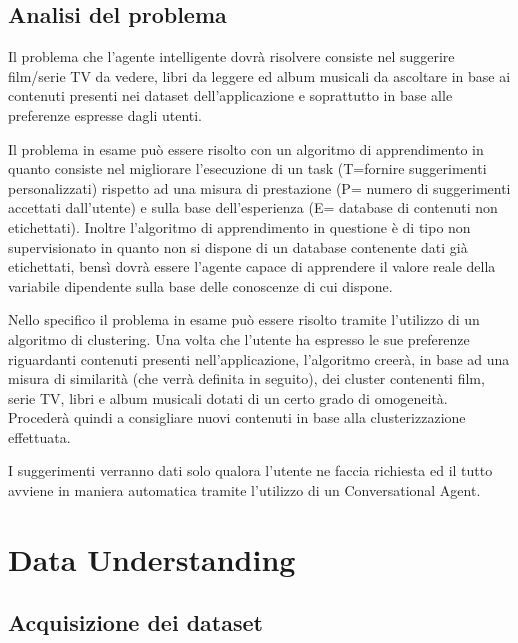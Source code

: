 \documentclass[a4paper, 12pt]{report}
\begin{document}
    \section{Analisi del problema}\label{sec:analisi-del-problema}
    Il problema che l’agente intelligente dovrà risolvere consiste nel suggerire film/serie TV da vedere,
        libri da leggere ed album musicali da ascoltare in base ai contenuti presenti nei dataset dell’applicazione
        e soprattutto in base alle preferenze espresse dagli utenti.

        Il problema in esame può essere risolto con un algoritmo di apprendimento in quanto consiste nel migliorare
        l’esecuzione di un task (T=fornire suggerimenti personalizzati) rispetto ad una misura di prestazione
        (P= numero di suggerimenti accettati dall’utente) e sulla base dell’esperienza (E= database di contenuti non
        etichettati).
        Inoltre l’algoritmo di apprendimento in questione è di tipo non supervisionato in quanto non si dispone di un
        database contenente dati già etichettati, bensì dovrà essere l’agente capace di apprendere il valore reale
        della variabile dipendente sulla base delle conoscenze di cui dispone.

        Nello specifico il problema in esame può essere risolto tramite l’utilizzo di un algoritmo di clustering.
        Una volta che l’utente ha espresso le sue preferenze riguardanti contenuti presenti nell’applicazione, l’algoritmo
        creerà, in base ad una misura di similarità (che verrà definita in seguito), dei cluster contenenti film, serie TV,
        libri e album musicali dotati di un certo grado di omogeneità.
        Procederà quindi a consigliare nuovi contenuti in base alla clusterizzazione effettuata.

        I suggerimenti verranno dati solo qualora l’utente ne faccia richiesta ed il tutto avviene in maniera
        automatica tramite l’utilizzo di un Conversational Agent.

    \chapter{Data Understanding}\label{ch:data-understanding}


    \section{Acquisizione dei dataset}\label{sec:acquisizione-dei-dataset}
\end{document}
